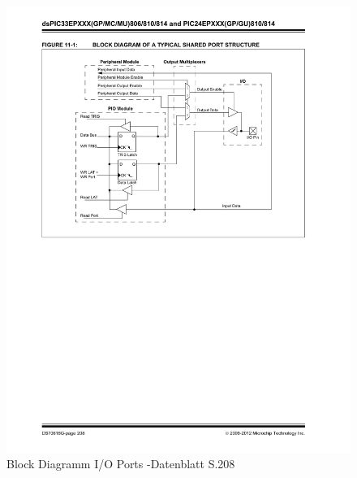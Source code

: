 \begin{figure}[!h]
	\centering
	\includegraphics[width=\textwidth]{Images/page208}
	\caption[Block Diagramm I/O Ports]{Block Diagramm I/O Ports -Datenblatt S.208}
	\label{image:page208}
\end{figure}	

